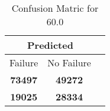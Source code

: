 \begin{table}[] 
\label{Table: Prediction Accuracy-DMD60.0OnlySunEKF-combinationReflection-Reflection} 
\caption{Confusion Matric for 60.0} 
\centering 
\begin{tabular} 
 {@{}ccc@{}} 
\toprule 
\multicolumn{2}{c}{\textbf{Predicted}}
 \\ \midrule 
\multicolumn{1}{|c|}{Failure} & 
\multicolumn{1}{c|}{No Failure}
 \\ \midrule 
\multicolumn{1}{|c|}{\color{green}\textbf{73497}} & 
\multicolumn{1}{c|}{\color{green}\textbf{49272}}
 \\ \midrule 
\multicolumn{1}{|c|}{\color{red}\textbf{19025}} & 
\multicolumn{1}{c|}{\color{red}\textbf{28334}}
 \\ \bottomrule 
\end{tabular} 
\end{table} 

